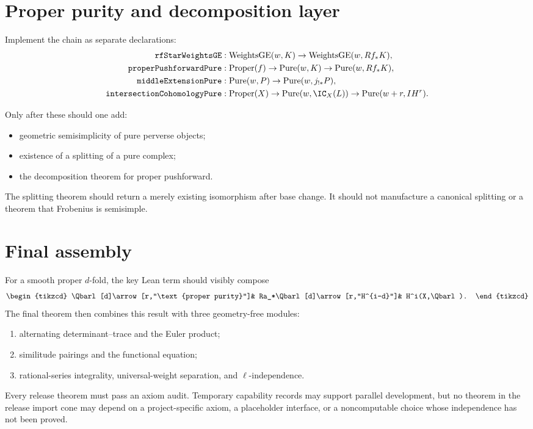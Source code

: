 \section{Proper purity and decomposition layer}

Implement the chain as separate declarations:
\[
\begin{aligned}
\texttt{rfStarWeightsGE}&:
 \operatorname{WeightsGE}(w,K)\to
 \operatorname{WeightsGE}(w,Rf_*K),\\
\texttt{properPushforwardPure}&:
 \operatorname{Proper}(f)\to\operatorname{Pure}(w,K)\to
 \operatorname{Pure}(w,Rf_*K),\\
\texttt{middleExtensionPure}&:
 \operatorname{Pure}(w,P)\to\operatorname{Pure}(w,j_{!*}P),\\
\texttt{intersectionCohomologyPure}&:
 \operatorname{Proper}(X)\to
 \operatorname{Pure}(w,\IC_X(L))\to
 \operatorname{Pure}(w+r,IH^r).
\end{aligned}
\]

Only after these should one add:

\begin{itemize}
\item geometric semisimplicity of pure perverse objects;
\item existence of a splitting of a pure complex;
\item the decomposition theorem for proper pushforward.
\end{itemize}

The splitting theorem should return a merely existing isomorphism after base
change.  It should not manufacture a canonical splitting or a theorem that
Frobenius is semisimple.

\section{Final assembly}

For a smooth proper \(d\)-fold, the key Lean term should visibly compose
\[
\begin{tikzcd}
\Qbarl[d]\arrow[r,"\text{proper purity}"]&
Ra_*\Qbarl[d]\arrow[r,"H^{i-d}"]&
H^i(X,\Qbarl).
\end{tikzcd}
\]
The final theorem then combines this result with three geometry-free modules:

\begin{enumerate}
\item alternating determinant--trace and the Euler product;
\item similitude pairings and the functional equation;
\item rational-series integrality, universal-weight separation, and
      \(\ell\)-independence.
\end{enumerate}

Every release theorem must pass an axiom audit.  Temporary capability records
may support parallel development, but no theorem in the release import cone
may depend on a project-specific axiom, a placeholder interface, or a
noncomputable choice whose independence has not been proved.
